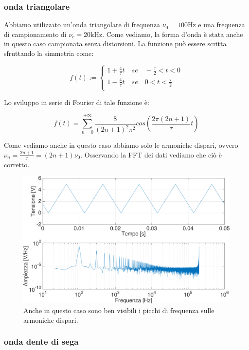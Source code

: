 \subsubsection{onda triangolare}
Abbiamo utilizzato un'onda triangolare di frequenza $\nu_0=100 \si{\hertz}$ e una frequenza di campionamento di $\nu_c=20\si{\kilo\hertz}$. Come vediamo, la forma d'onda è stata anche in questo caso campionata senza distorsioni. La funzione può essere scritta sfruttando la simmetria come:

\begin{displaymath}
f(t):=
\begin{cases}
1+\frac{4}{\tau}t \quad se \quad -\frac{\tau}{2}<t<0 \\
1-\frac{4}{\tau}t \quad se \quad 0<t<\frac{\tau}{2} \\ 
\end{cases}
\end{displaymath}

Lo sviluppo in serie di Fourier di tale funzione è:

\begin{equation}
f(t)=\sum_{n=0}^{+\infty}\frac{8}{(2n+1)^2\pi^2}cos (\frac{2\pi(2n+1)}{\tau}t)
\end{equation}

Come vediamo anche in questo caso abbiamo solo le armoniche dispari, ovvero $\nu_n=\frac{2n+1}{\tau}=(2n+1)\nu_0$. Osservando la FFT dei dati vediamo che ciò è corretto. 

\begin{figure}[H]
\centering
	\includegraphics[width=.65\textwidth]{../E13/latex/triangolare100hz@10000,200000_crop.pdf}
	\caption{Anche in questo caso sono ben visibili i picchi di frequenza sulle armoniche dispari. }
	\label{triangolare}
\end{figure}

\subsubsection{onda dente di sega}

